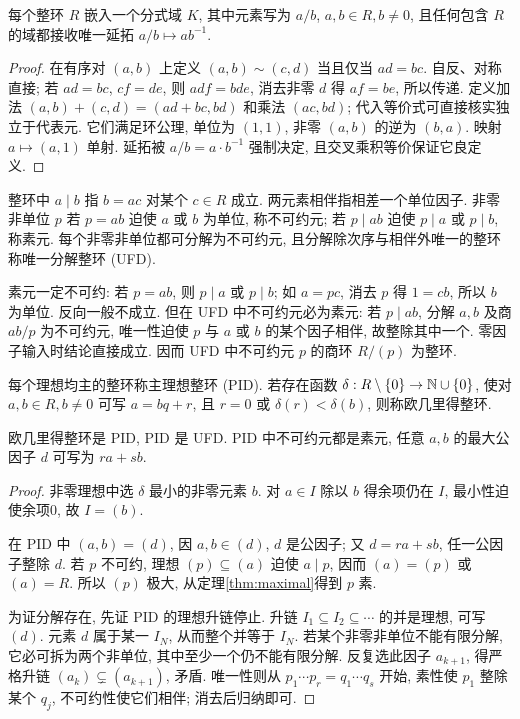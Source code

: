 \begin{theorem}
每个整环 $R$ 嵌入一个分式域 $K$, 其中元素写为 $a/b$, $a,b\in R,b\ne0$, 且任何包含 $R$ 的域都接收唯一延拓 $a/b\mapsto a b^{-1}$.
\end{theorem}
\begin{proof}
在有序对 $(a,b)$ 上定义 $(a,b)\sim(c,d)$ 当且仅当 $ad=bc$. 自反、对称直接; 若 $ad=bc$, $cf=de$, 则 $adf=bde$, 消去非零 $d$ 得 $af=be$, 所以传递. 定义加法 $(a,b)+(c,d)=(ad+bc,bd)$ 和乘法 $(ac,bd)$; 代入等价式可直接核实独立于代表元. 它们满足环公理, 单位为 $(1,1)$, 非零 $(a,b)$ 的逆为 $(b,a)$. 映射 $a\mapsto(a,1)$ 单射. 延拓被 $a/b=a\cdot b^{-1}$ 强制决定, 且交叉乘积等价保证它良定义.
\end{proof}
\begin{definition}
整环中 $a\mid b$ 指 $b=ac$ 对某个 $c\in R$ 成立. 两元素相伴指相差一个单位因子. 非零非单位 $p$ 若 $p=ab$ 迫使 $a$ 或 $b$ 为单位, 称不可约元; 若 $p\mid ab$ 迫使 $p\mid a$ 或 $p\mid b$, 称素元. 每个非零非单位都可分解为不可约元, 且分解除次序与相伴外唯一的整环称唯一分解整环 (UFD).
\end{definition}
素元一定不可约: 若 $p=ab$, 则 $p\mid a$ 或 $p\mid b$; 如 $a=pc$, 消去 $p$ 得 $1=cb$, 所以 $b$ 为单位. 反向一般不成立. 但在 UFD 中不可约元必为素元: 若 $p\mid ab$, 分解 $a,b$ 及商 $ab/p$ 为不可约元, 唯一性迫使 $p$ 与 $a$ 或 $b$ 的某个因子相伴, 故整除其中一个. 零因子输入时结论直接成立. 因而 UFD 中不可约元 $p$ 的商环 $R/(p)$ 为整环.
\begin{definition}
每个理想均主的整环称主理想整环 (PID). 若存在函数 $\delta:R\setminus\{0\}\to\mathbb N\cup\{0\}$, 使对 $a,b\in R,b\ne0$ 可写 $a=bq+r$, 且 $r=0$ 或 $\delta(r)<\delta(b)$, 则称欧几里得整环.
\end{definition}
\begin{theorem}\label{thm:pidufd}
欧几里得整环是 PID, PID 是 UFD. PID 中不可约元都是素元, 任意 $a,b$ 的最大公因子 $d$ 可写为 $ra+sb$.
\end{theorem}
\begin{proof}
非零理想中选 $\delta$ 最小的非零元素 $b$. 对 $a\in I$ 除以 $b$ 得余项仍在 $I$, 最小性迫使余项0, 故 $I=(b)$.

在 PID 中 $(a,b)=(d)$, 因 $a,b\in(d)$, $d$ 是公因子; 又 $d=ra+sb$, 任一公因子整除 $d$. 若 $p$ 不可约, 理想 $(p)\subseteq(a)$ 迫使 $a\mid p$, 因而 $(a)=(p)$ 或 $(a)=R$. 所以 $(p)$ 极大, 从定理\ref{thm:maximal}得到 $p$ 素.

为证分解存在, 先证 PID 的理想升链停止. 升链 $I_1\subseteq I_2\subseteq\cdots$ 的并是理想, 可写 $(d)$. 元素 $d$ 属于某一 $I_N$, 从而整个并等于 $I_N$. 若某个非零非单位不能有限分解, 它必可拆为两个非单位, 其中至少一个仍不能有限分解. 反复选此因子 $a_{k+1}$, 得严格升链 $(a_k)\subsetneq(a_{k+1})$, 矛盾. 唯一性则从 $p_1\cdots p_r=q_1\cdots q_s$ 开始, 素性使 $p_1$ 整除某个 $q_j$, 不可约性使它们相伴; 消去后归纳即可.
\end{proof}
